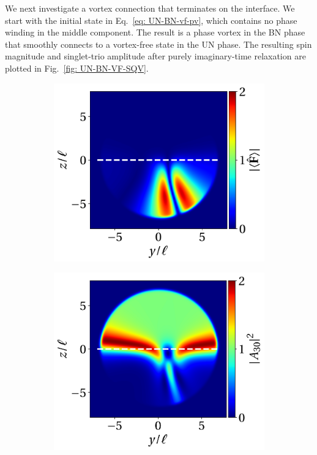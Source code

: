 We next investigate a vortex connection that terminates on the interface.
We start with the initial state in Eq.~\eqref{eq: UN-BN-vf-pv}, which contains
no phase winding in the middle component.
The result is a phase vortex in the BN phase that smoothly connects to a
vortex-free state in the UN phase.
The resulting spin magnitude and singlet-trio amplitude after purely
imaginary-time relaxation are plotted in Fig.~\ref{fig: UN-BN-VF-SQV}.
\begin{figure}
    \centering
    \begin{subfigure}{0.45\textwidth}
        \includegraphics[width=\textwidth]
        {gfx/ch-spin2/UN-BN_VF-SQV_spin_mag.pdf}
        \caption{}
    \end{subfigure}
    \begin{subfigure}{0.45\textwidth}
        \includegraphics[width=\textwidth]{gfx/ch-spin2/UN-BN_VF-SQV_a30.pdf}

\end{subfigure}
\end{figure}
